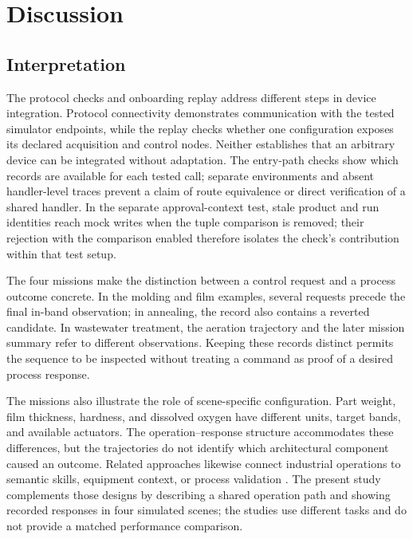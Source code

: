 \section{Discussion}
\label{sec:discussion}
\subsection{Interpretation}
The protocol checks and onboarding replay address different steps in device
integration. Protocol connectivity demonstrates communication with the tested
simulator endpoints, while the replay checks whether one configuration exposes
its declared acquisition and control nodes. Neither establishes that an
arbitrary device can be integrated without adaptation. The entry-path checks
show which records are available for each tested call; separate environments
and absent handler-level traces prevent a claim of route equivalence or direct
verification of a shared handler. In the separate
approval-context test, stale product and run identities reach mock writes when
the tuple comparison is removed; their rejection with the comparison enabled
therefore isolates the check's contribution within that test setup.

The four missions make the distinction between a control request and a
process outcome concrete. In the molding and film examples, several requests
precede the final in-band observation; in annealing, the record also contains
a reverted candidate. In wastewater treatment, the aeration trajectory and
the later mission summary refer to different observations. Keeping these
records distinct permits the sequence to be inspected without treating a
command as proof of a desired process response.

The missions also illustrate the role of scene-specific configuration.
Part weight, film thickness, hardness, and dissolved oxygen have different
units, target bands, and available actuators. The operation--response
structure accommodates these differences, but the trajectories do not
identify which architectural component caused an outcome. Related approaches
likewise connect industrial operations to semantic skills, equipment context,
or process validation \cite{koehle2025semanticrecipes,graul2026aas,schall2026safe}.
The present study complements those designs by describing a shared operation
path and showing recorded responses in four simulated scenes; the studies use
different tasks and do not provide a matched performance comparison.

